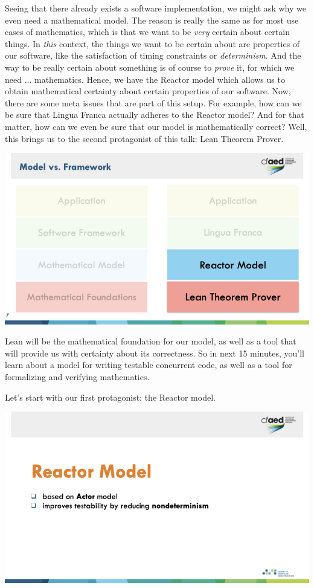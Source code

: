 \documentclass{article}
\begin{document}
Seeing that there already exists a software implementation, we might ask why we even need a mathematical model.
The reason is really the same as for most use cases of mathematics, which is that we want to be \emph{very} certain about certain things.
In \emph{this} context, the things we want to be certain about are properties of our software, like the satisfaction of timing constraints or \emph{determinism}.
And the way to be really certain about something is of course to \emph{prove} it, for which we need ... mathematics. 
Hence, we have the Reactor model which allows us to obtain mathematical certainty about certain properties of our software.
Now, there are some meta issues that are part of this setup.
For example, how can we be sure that Lingua Franca actually adheres to the Reactor model? 
And for that matter, how can we even be sure that our model is mathematically correct?
Well, this brings us to the second protagonist of this talk: Lean Theorem Prover.

\begin{center}
    \includegraphics[width=\columnwidth]{Slides/Slide 7.jpeg}
\end{center}

Lean will be the mathematical foundation for our model, as well as a tool that will provide us with certainty about its correctness.
So in next 15 minutes, you'll learn about a model for writing testable concurrent code, as well as a tool for formalizing and verifying mathematics.  

Let's start with our first protagonist: the Reactor model.

\begin{center}
    \includegraphics[width=\columnwidth]{Slides/Slide 8.jpeg}
\end{center}
\end{document}
